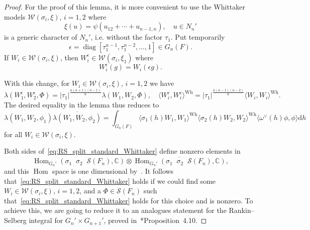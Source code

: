 \documentclass[letterpaper,11pt]{amsart}
\newcommand{\C}{\mathbb{C}}
\newcommand{\cS}{\mathcal{S}}
\newcommand{\cW}{\mathcal{W}}
\newcommand{\rd}{\mathrm{d}}
\newcommand{\<}{\negthickspace}
\DeclareMathOperator{\diag}{diag} \DeclareMathOperator{\supp}{supp}
\providecommand{\abs}[1]{\lvert#1\rvert}
\DeclareMathOperator{\Hom}{Hom}
\DeclareMathOperator{\otimeshat}{\widehat{\otimes}}
\theoremstyle{definition}
\theoremstyle{plain}
\theoremstyle{remark}
\numberwithin{equation}{section}
\begin{document}
\begin{proof}
For the proof of this lemma, it is more convenient to use the Whittaker
models $\cW(\sigma_i, \xi)$, $i = 1, 2$ where
    \[
    \xi(u) = \psi(u_{12}+ \cdots + u_{n-1, n}), \quad u \in N_n'
    \]
is a generic character of $N_n'$, i.e. without the factor $\tau_1$. Put
temporarily
    \[
    \epsilon = \diag[\tau_1^{n-1}, \tau_1^{n-2}, \hdots, 1] \in G_n(F).
    \]
If $W_i \in \cW(\sigma_i, \xi)$, then $W_i^{\epsilon} \in \cW(\sigma_i,
\xi_1)$ where
    \[
    W_i^{\epsilon}(g) = W_i(\epsilon g).
    \]

With this change, for $W_i \in \cW(\sigma_i, \xi)$, $i = 1, 2$ we have
    \[
    \lambda(W_1^{\epsilon}, W_2^{\epsilon}, \Phi) =
    \abs{\tau_1}^{\frac{n(n+1)(n-1)}{6}}
    \lambda(W_1, W_2, \Phi), \quad
    \langle W_i^{\epsilon}, W_i^{\epsilon} \rangle^{\mathrm{Wh}} =
    \abs{\tau_1}^{\frac{n(n-1)(n-2)}{6}}
    \langle W_i, W_i \rangle^{\mathrm{Wh}}.
    \]
The desired equality in the lemma thus reduces to
    \begin{equation}    \label{eq:RS_split_standard_Whittaker}
    \lambda(W_1, W_2, \phi_1)\overline{\lambda(W_1, W_2, \phi_2)}
     = \int_{G_n(F)}
    \langle \sigma_1(h) W_1, W_1 \rangle^{\mathrm{Wh}}
    \langle \sigma_2(h) W_2, W_2 \rangle^{\mathrm{Wh}}
    \langle \omega^\vee(h) \phi, \phi \rangle \rd h
    \end{equation}
for all $W_i \in \cW(\sigma_i, \xi)$.

Both sides of~\eqref{eq:RS_split_standard_Whittaker} define nonzero elements
in
    \[
    \Hom_{G_n'}(\sigma_1 \otimeshat \sigma_2 \otimeshat \cS(F_{n}), \C)
    \otimes \overline{
    \Hom_{G_n'}(\sigma_1 \otimeshat \sigma_2 \otimeshat \cS(F_{n}), \C)
    },
    \]
and this $\Hom$ space is one dimensional by~\cites{Sun,SZ}. It follows
that~\eqref{eq:RS_split_standard_Whittaker} holds if we could
find some $W_i \in \cW(\sigma_i, \xi)$, $i= 1, 2$, and a $\Phi \in \cS(F_n)$
such that~\eqref{eq:RS_split_standard_Whittaker} holds for this choice and
is nonzero. To achieve this,
we are going to reduce it to an analogues
statement for the Rankin--Selberg integral for $G_n' \times G_{n+1}'$, proved
in~\cite{Zhang2}*{Proposition~4.10}.


\end{proof}
\end{document}
